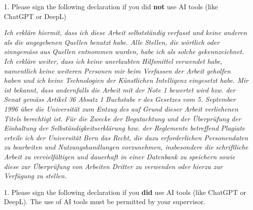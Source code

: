 
\vspace*{0cm}
\vfill
\noindent\parbox[b][0.5\textheight]{\textwidth}
{
		\vfill
		\noindent\normalsize\mdseries\itshape
        \par
        \noindent\normalsize\normalfont
		{
			\par
   1. Please sign the following declaration if you did \textbf{not} use AI tools (like ChatGPT or DeepL)\par
		}\par
	\vspace{0.5cm}

\textit{\glqq Ich erkl{\"a}re hiermit, dass ich diese Arbeit selbstst{\"a}ndig verfasst und keine anderen als die angegebenen Quellen benutzt habe. Alle Stellen, die w{\"o}rtlich oder sinngem{\"a}ss aus Quellen entnommen wurden, habe ich als solche gekennzeichnet. Ich erkl{\"a}re weiter, dass ich keine unerlaubten Hilfsmittel verwendet habe, namentlich keine weiteren Personen mir beim Verfassen der Arbeit geholfen haben und ich keine Technologien der K{\"u}nstlichen Intelligenz eingesetzt habe. Mir ist bekannt, dass andernfalls die Arbeit mit der Note 1 bewertet wird bzw. der Senat gem{\"a}ss Artikel 36 Absatz 1 Buchstabe r des Gesetzes vom 5. September 1996 {\"u}ber die Universit{\"a}t zum Entzug des auf Grund dieser Arbeit verliehenen Titels berechtigt ist. \newline
F{\"u}r die Zwecke der Begutachtung und der {\"U}berpr{\"u}fung der Einhaltung der Selbst{\"a}ndigkeitserkl{\"a}rung bzw. der Reglemente betreffend Plagiate erteile ich der Universit{\"a}t Bern das Recht, die dazu erforderlichen Personendaten zu bearbeiten und Nutzungshandlungen vorzunehmen, insbesondere die schriftliche Arbeit zu vervielf{\"a}ltigen und dauerhaft in einer Datenbank zu speichern sowie diese zur {\"U}berpr{\"u}fung von Arbeiten Dritter zu verwenden oder hierzu zur Verf{\"u}gung zu stellen.\grqq{}}
    \par
	\vspace{1cm}

    \noindent\normalsize\normalfont
    {
    \par
    1. Please sign the following declaration if you \textbf{did} use AI tools (like ChatGPT or DeepL). The use of AI tools must be permitted by your supervisor. \par
    }\par
	\vspace{0.5cm}


}
